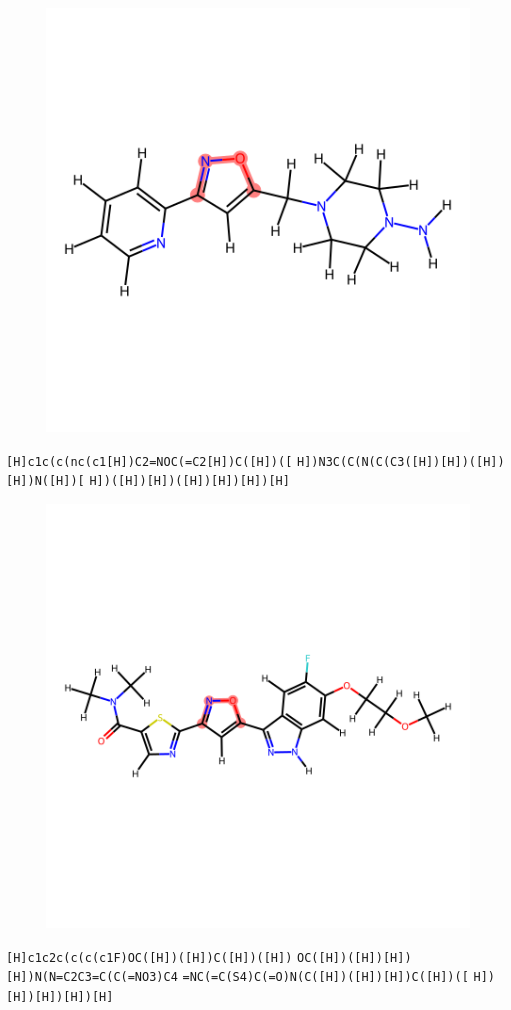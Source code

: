 \documentclass{article}
\begin{document}
\begin{figure}[ht]
\centering
    \includegraphics{mol162.png}
\end{figure}
\verb|[H]c1c(c(nc(c1[H])C2=NOC(=C2[H])C([H])([| \verb|H])N3C(C(N(C(C3([H])[H])([H])[H])N([H])[| \verb|H])([H])[H])([H])[H])[H])[H]|

\begin{figure}[ht]
\centering
    \includegraphics{mol163.png}
\end{figure}
\verb|[H]c1c2c(c(c(c1F)OC([H])([H])C([H])([H])| \verb|OC([H])([H])[H])[H])N(N=C2C3=C(C(=NO3)C4| \verb|=NC(=C(S4)C(=O)N(C([H])([H])[H])C([H])([| \verb|H])[H])[H])[H])[H]|
\end{document}
